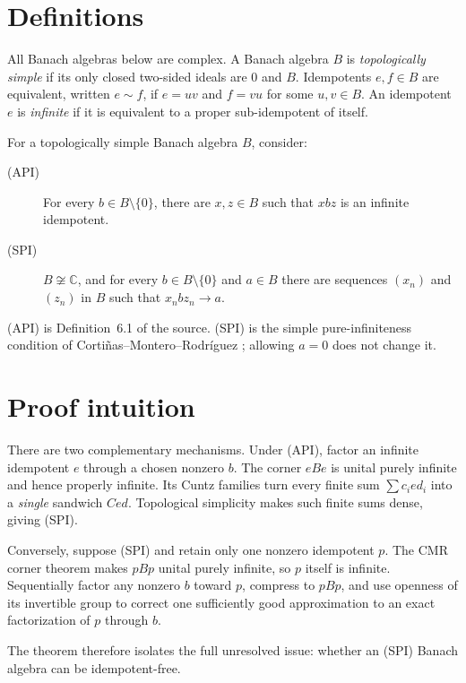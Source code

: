 \documentclass[11pt]{article}
\newcommand{\C}{\mathbb C}
\begin{document}
\section{Definitions}

All Banach algebras below are complex.  A Banach algebra $B$ is
\emph{topologically simple} if its only closed two-sided ideals are $0$ and
$B$.  Idempotents $e,f\in B$ are equivalent, written $e\sim f$, if
$e=uv$ and $f=vu$ for some $u,v\in B$.  An idempotent $e$ is
\emph{infinite} if it is equivalent to a proper sub-idempotent of itself.

For a topologically simple Banach algebra $B$, consider:

\begin{description}
\item[(API)] For every $b\in B\setminus\{0\}$, there are $x,z\in B$ such
that $xbz$ is an infinite idempotent.

\item[(SPI)] $B\not\cong\C$, and for every $b\in B\setminus\{0\}$ and
$a\in B$ there are sequences $(x_n)$ and $(z_n)$ in $B$ such that
$x_nbz_n\to a$.
\end{description}

(API) is Definition~6.1 of the source.  (SPI) is the simple pure-infiniteness
condition of Corti\~nas--Montero--Rodr\'iguez \cite{CMR}; allowing $a=0$
does not change it.

\section{Proof intuition}

There are two complementary mechanisms.  Under (API), factor an infinite
idempotent $e$ through a chosen nonzero $b$.  The corner $eBe$ is unital
purely infinite and hence properly infinite.  Its Cuntz families turn every
finite sum $\sum c_i e d_i$ into a \emph{single} sandwich $Ced$.
Topological simplicity makes such finite sums dense, giving (SPI).

Conversely, suppose (SPI) and retain only one nonzero idempotent $p$.  The CMR
corner theorem makes $pBp$ unital purely infinite, so $p$ itself is infinite.
Sequentially factor any nonzero $b$ toward $p$, compress to $pBp$, and use
openness of its invertible group to correct one sufficiently good
approximation to an exact factorization of $p$ through $b$.

The theorem therefore isolates the full unresolved issue: whether an (SPI)
Banach algebra can be idempotent-free.
\end{document}
